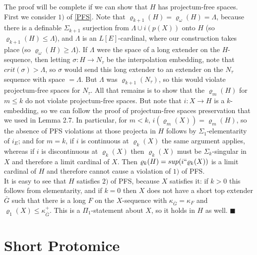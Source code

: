 \documentclass[12pt]{article}
\begin{document}
The proof will be complete if we can show that $H$ has projectum-free spaces.  First we consider $1)$ of \ref{PFS}.  Note that $\varrho_{k+1}(H) = \varrho_\omega (H) = \Lambda$, because there is a definable $\Sigma_{k+1}$ surjection from $\Lambda \cup i (p(X))$ onto $H$ (so $\varrho_{k+1}(H) \leq \Lambda$), and $\Lambda$ is an $L[E]$-cardinal, where our construction takes place (so $\varrho_\omega (H) \geq \Lambda$).  If $\Lambda$ were the space of a long extender on the $H$-sequence, then letting $\sigma : H \longrightarrow N_\tau$ be the interpolation embedding, note that $crit (\sigma) > \Lambda$, so $\sigma$ would send this long extender to an extender on the $N_\tau$ sequence with space $= \Lambda$.  But $\Lambda$ was $\varrho_{k+1}(N_\tau)$, so this would violate projectum-free spaces for $N_\tau$.  All that remains is to show that the $\varrho_m (H)$ for $m \leq k$ do not violate projectum-free spaces.  But note that $i : X \longrightarrow H$ is a $k$-embedding, so we can follow the proof of projectum-free spaces preservation that we used in Lemma 2.7.  In particular, for $m < k$, $i (\varrho_m(X)) = \varrho_m(H)$, so the absence of PFS violations at those projecta in $H$ follows by $\Sigma_1$-elementarity of $i_E$; and for $m = k$, if $i$ is continuous at $\varrho_k(X)$ the same argument applies, whereas if $i$ is discontinuous at $\varrho_k(X)$ then $\varrho_k (X)$ must be $\Sigma_k$-singular in $X$ and therefore a limit cardinal of $X$.  Then $\varrho_k (H) = sup ( i `` \varrho_k (X))$ is a limit cardinal of $H$ and therefore cannot cause a violation of $1)$ of PFS.\\

It is easy to see that $H$ satisfies $2)$ of PFS, because $X$ satisfies it: if $k > 0$ this follows from elementarity, and if $k = 0$ then $X$ does not have a short top extender $\bar{G}$ such that there is a long $F$ on the $X$-sequence with $\kappa_{\bar{G}} = \kappa_F$ and $\varrho_1 (X) \leq \kappa_{\bar{G}}^+$.  This is a $\Pi_1$-statement about $X$, so it holds in $H$ as well.  $\blacksquare$\\











\section{Short Protomice}
\end{document}
